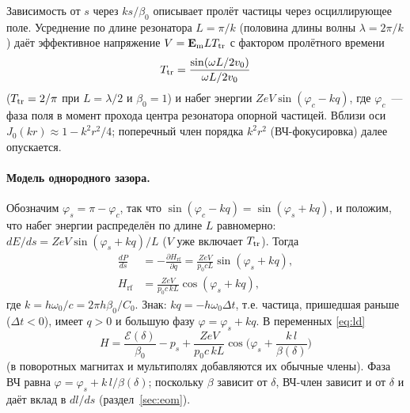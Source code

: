 \documentclass[a4paper,11pt]{article}
\numberwithin{equation}{section}
\newcommand{\rf}{\mathrm{rf}}
\newcommand{\cE}{\mathcal{E}}
\begin{document}
Зависимость от $s$ через $ks/\beta_0$ описывает пролёт частицы через осциллирующее поле. Усреднение по длине
резонатора $L=\pi/k$ (половина длины волны $\lambda=2\pi/k$) даёт эффективное напряжение $V=\mathbf E_{\rm m}LT_{\rm tr}$ с фактором пролётного времени
\begin{equation}
T_{\rm tr}=\frac{\sin(\omega L/2v_0)}{\omega L/2v_0}
\end{equation}
($T_{\rm tr}=2/\pi$ при $L=\lambda/2$ и $\beta_0=1$) и набег энергии $ZeV\sin(\varphi_c-kq)$, где $\varphi_c$~--- фаза
поля в момент прохода центра резонатора опорной частицей. Вблизи оси $J_0(kr)\approx 1-k^2r^2/4$;
поперечный член порядка $k^2r^2$ (ВЧ-фокусировка) далее опускается.

\paragraph{Модель однородного зазора.}
Обозначим $\varphi_s=\pi-\varphi_c$, так что $\sin(\varphi_c-kq)=\sin(\varphi_s+kq)$, и положим, что набег энергии
распределён по длине $L$ равномерно: $dE/ds=ZeV\sin(\varphi_s+kq)/L$ ($V$ уже включает $T_{\rm tr}$). Тогда
\begin{equation}
\begin{aligned}
\frac{dP}{ds}&=-\frac{\partial H_\rf}{\partial q}=\frac{ZeV}{p_0cL}\sin(\varphi_s+kq),\\
H_\rf&=\frac{ZeV}{p_0c\,kL}\cos(\varphi_s+kq),
\end{aligned} \label{eq:Hrf}
\end{equation}
где $k=h\omega_0/c=2\pi h\beta_0/C_0$. Знак: $kq=-h\omega_0\Delta t$, т.е. частица, пришедшая
раньше ($\Delta t<0$), имеет $q>0$ и большую фазу $\varphi=\varphi_s+kq$. В переменных \eqref{eq:ld}
\begin{equation}
\boxed{\ H=\frac{\cE(\delta)}{\beta_0}-p_s+\frac{ZeV}{p_0c\,kL}\cos\!\Big(\varphi_s+\frac{k\,l}{\beta(\delta)}\Big)\ }
\label{eq:Hfull}
\end{equation}
(в поворотных магнитах и мультиполях добавляются их обычные члены). Фаза ВЧ равна
$\varphi=\varphi_s+k\,l/\beta(\delta)$; поскольку $\beta$ зависит от $\delta$, ВЧ-член зависит и от $\delta$ и даёт
вклад в $dl/ds$ (раздел~\ref{sec:eom}).
\end{document}
